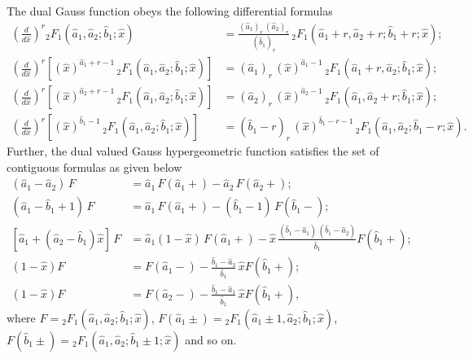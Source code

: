 \documentclass[11pt,a4paper,fleqn]{article}
\numberwithin{equation}{section}
\numberwithin{lemma}{section}
\numberwithin{theorem}{section}
\numberwithin{corollary}{section}
\begin{document}
The dual Gauss function obeys the following differential formulas
\begin{align*}
\left(\frac{d}{d \widehat{x}}\right)^r {}_2F_1 (\widehat{a}_1, \widehat{a}_2; \widehat{b}_1;  \widehat{x}) & = \frac{(\widehat{a}_1)_r \, (\widehat{a}_2)_r }{(\widehat{b}_1)_r } \, {}_2F_1 (\widehat{a}_1 + r, \widehat{a}_2 + r; \widehat{b}_1 + r;  \widehat{x});
\\[5pt]
\left(\frac{d}{d \widehat{x}}\right)^r [(\widehat{x})^{\widehat{a}_1 + r - 1} \, {}_2F_1 (\widehat{a}_1, \widehat{a}_2; \widehat{b}_1;  \widehat{x})] & = (\widehat{a}_1)_r \, (\widehat{x})^{\widehat{a}_1 - 1} \, {}_2F_1 (\widehat{a}_1 + r, \widehat{a}_2; \widehat{b}_1;  \widehat{x});
\\[5pt]
\left(\frac{d}{d \widehat{x}}\right)^r [(\widehat{x})^{\widehat{a}_2 + r - 1} \, {}_2F_1 (\widehat{a}_1, \widehat{a}_2; \widehat{b}_1;  \widehat{x})] & = (\widehat{a}_2)_r \, (\widehat{x})^{\widehat{a}_2 - 1} \, {}_2F_1 (\widehat{a}_1, \widehat{a}_2 + r; \widehat{b}_1;  \widehat{x});
\\[5pt]
\left(\frac{d}{d \widehat{x}}\right)^r [(\widehat{x})^{\widehat{b}_1  - 1} \, {}_2F_1 (\widehat{a}_1, \widehat{a}_2; \widehat{b}_1;  \widehat{x})] & = (\widehat{b}_1 - r)_r \, (\widehat{x})^{\widehat{b}_1 - r - 1} \, {}_2F_1 (\widehat{a}_1, \widehat{a}_2; \widehat{b}_1 - r;  \widehat{x}).
\end{align*}
Further, the dual valued Gauss hypergeometric function satisfies the set of contiguous formulas as given below
\begin{align*}
	(\widehat{a}_1 - \widehat{a}_2) \, F & = \widehat{a}_1 \, F (\widehat{a}_1 +) - \widehat{a}_2 \, F(\widehat{a}_2 +);
	\\[5pt]
	(\widehat{a}_1 - \widehat{b}_1 + 1) \, F & = \widehat{a}_1 \, F (\widehat{a}_1 +) - (\widehat{b}_1 - 1) \, F(\widehat{b}_1 -);
	\\[5pt]
	[ \widehat{a}_1 + (\widehat{a}_2 - \widehat{b}_1) \widehat{x}] \, F & = \widehat{a}_1 (1 - \widehat{x}) \, F(\widehat{a}_1 +) - \widehat{x} \, \frac{(\widehat{b}_1 - \widehat{a}_1) \, (\widehat{b}_1 - \widehat{a}_2)}{ \widehat{b}_1} F (\widehat{b}_1 +);
	\\[5pt]
	(1 - \widehat{x}) F & = F  (\widehat{a}_1 -)  - \frac{\widehat{b}_1 - \widehat{a}_2}{\widehat{b}_1} \, \widehat{x} F(\widehat{b}_1 +);
	\\[5pt]
	(1 - \widehat{x}) F & = F  (\widehat{a}_2 -)  - \frac{\widehat{b}_1 - \widehat{a}_1}{\widehat{b}_1} \, \widehat{x} F(\widehat{b}_1 +),
\end{align*}
where $F = {}_2F_1 (\widehat{a}_1, \widehat{a}_2; \widehat{b}_1;  \widehat{x})$, $F(\widehat{a}_1 \pm) = {}_2F_1 (\widehat{a}_1 \pm 1, \widehat{a}_2; \widehat{b}_1;  \widehat{x})$, $F(\widehat{b}_1 \pm) = {}_2F_1 (\widehat{a}_1, \widehat{a}_2; \widehat{b}_1 \pm 1;  \widehat{x})$ and so on. 
\end{document}
